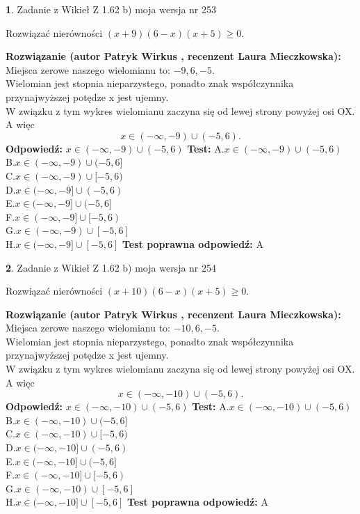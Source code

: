 \documentclass[12pt, a4paper]{article}
\theoremstyle{definition} %
\newtheorem{zad}{}
\newcommand{\zadStart}[1]{\begin{zad}#1\newline}
\newcommand{\zadStop}{\end{zad}}
\newcommand{\rozwStart}[2]{\noindent \textbf{Rozwiązanie (autor #1 , recenzent #2): }\newline}
\newcommand{\rozwStop}{\newline}
\newcommand{\odpStart}{\noindent \textbf{Odpowiedź:}\newline}
\newcommand{\odpStop}{\newline}
\newcommand{\testStart}{\noindent \textbf{Test:}\newline}
\newcommand{\testStop}{\newline}
\newcommand{\kluczStart}{\noindent \textbf{Test poprawna odpowiedź:}\newline}
\newcommand{\kluczStop}{\newline}
\begin{document}
\zadStart{Zadanie z Wikieł Z 1.62 b) moja wersja nr 253}

Rozwiązać nierówności $(x+9)(6-x)(x+5)\ge0$.
\zadStop
\rozwStart{Patryk Wirkus}{Laura Mieczkowska}
Miejsca zerowe naszego wielomianu to: $-9, 6, -5$.\\
Wielomian jest stopnia nieparzystego, ponadto znak współczynnika przy\linebreak najwyższej potędze x jest ujemny.\\ W związku z tym wykres wielomianu zaczyna się od lewej strony powyżej osi OX. A więc $$x \in (-\infty,-9) \cup (-5,6).$$
\rozwStop
\odpStart
$x \in (-\infty,-9) \cup (-5,6)$
\odpStop
\testStart
A.$x \in (-\infty,-9) \cup (-5,6)$\\
B.$x \in (-\infty,-9) \cup (-5,6]$\\
C.$x \in (-\infty,-9) \cup [-5,6)$\\
D.$x \in (-\infty,-9] \cup (-5,6)$\\
E.$x \in (-\infty,-9] \cup (-5,6]$\\
F.$x \in (-\infty,-9] \cup [-5,6)$\\
G.$x \in (-\infty,-9) \cup [-5,6]$\\
H.$x \in (-\infty,-9] \cup [-5,6]$
\testStop
\kluczStart
A
\kluczStop



\zadStart{Zadanie z Wikieł Z 1.62 b) moja wersja nr 254}

Rozwiązać nierówności $(x+10)(6-x)(x+5)\ge0$.
\zadStop
\rozwStart{Patryk Wirkus}{Laura Mieczkowska}
Miejsca zerowe naszego wielomianu to: $-10, 6, -5$.\\
Wielomian jest stopnia nieparzystego, ponadto znak współczynnika przy\linebreak najwyższej potędze x jest ujemny.\\ W związku z tym wykres wielomianu zaczyna się od lewej strony powyżej osi OX. A więc $$x \in (-\infty,-10) \cup (-5,6).$$
\rozwStop
\odpStart
$x \in (-\infty,-10) \cup (-5,6)$
\odpStop
\testStart
A.$x \in (-\infty,-10) \cup (-5,6)$\\
B.$x \in (-\infty,-10) \cup (-5,6]$\\
C.$x \in (-\infty,-10) \cup [-5,6)$\\
D.$x \in (-\infty,-10] \cup (-5,6)$\\
E.$x \in (-\infty,-10] \cup (-5,6]$\\
F.$x \in (-\infty,-10] \cup [-5,6)$\\
G.$x \in (-\infty,-10) \cup [-5,6]$\\
H.$x \in (-\infty,-10] \cup [-5,6]$
\testStop
\kluczStart
A
\kluczStop
\end{document}
